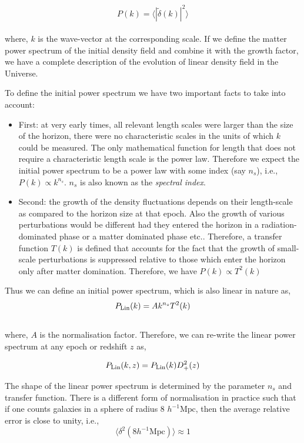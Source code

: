 \begin{equation}
		P(k)  =  \langle |\tilde{\delta}(k) |^2\rangle 
		\label{eqn:pkk}
\end{equation}
\\
where, $k$ is the wave-vector at the corresponding scale. If we 
define the matter power spectrum of the initial density field and combine
it with the growth factor, we have a complete description of the evolution 
of linear density field in the Universe. 

To define the initial power spectrum we have two important facts to 
take into account:
\begin{itemize}
  \item	First: at very early times, all relevant length scales
	were larger than the size of the horizon, there were no characteristic scales
	in the units of which $k$ could be measured. The only mathematical function
	for length that does not require a characteristic length scale is
	the power law. Therefore we expect the initial power spectrum to be a power
	law with some index (say $n_s$), i.e., $P(k)\propto k^{n_s}$. $n_s$ is also known
	as the {\it spectral index}.
  \item Second: the growth of the density fluctuations depends on their length-scale
  	as compared to the horizon size at that epoch. Also the growth of various
  	perturbations would be different had they entered the horizon in a radiation-
  	dominated phase or a matter dominated phase etc.. Therefore, a transfer function $T(k)$
  	is defined that accounts for the fact that the growth of small-scale perturbations
  	is suppressed relative to those which enter the horizon only after matter domination.
  	Therefore, we have $P(k) \propto T^2(k)$ 
\end{itemize}

Thus we can define an initial power spectrum, which is also linear in nature as,
\begin{equation}
	P_{\rm Lin}(k) = A k^{n_s} T^2(k)
\end{equation}
\\
where, $A$ is the normalisation factor. Therefore, we can re-write the linear
power spectrum at any epoch or redshift $z$ as,

\begin{equation}
	P_{\rm Lin}(k,z) = P_{\rm Lin}(k) D^2_+(z)
\end{equation}

The shape of the linear power spectrum is determined by the parameter $n_s$ and 
transfer function. There is a different form of normalisation in 
practice such that if one counts galaxies in a sphere of radius 8 $h^{-1} \mathrm{Mpc}$, then
the average relative error is close to unity, i.e.,
\begin{equation}
	\langle \delta^2(8 h^{-1} \mathrm{Mpc}) \rangle \approx 1 
\end{equation}

